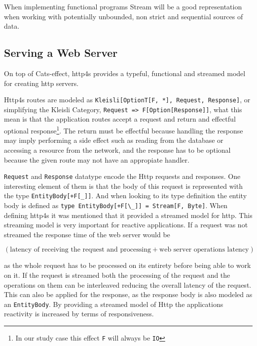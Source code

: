 \documentclass[../main.tex]{subfiles}
\begin{document}


When implementing functional programs Stream will be a good representation when working with
potentially unbounded, non strict and sequential sources of data.

\subsection{Serving a Web Server}
On top of Cats-effect, http4s provides a typeful, functional and streamed model
for creating http servers.

Http4s routes are modeled as \mbox{\texttt{Kleisli[OptionT[F,
*], Request, Response]}}, or simplifying the Kleisli Category, \mbox{\lstinline{Request => F[Option[Response]]}},
what this mean is that the application routes accept a request and return and
effectful optional response\footnote{In our study case this effect \texttt{F}
  will always be \texttt{IO}}. The return must be effectful because handling the
response may imply performing a side effect such as reading from the database or
accessing a resource from the network, and the response has to be optional
because the given route may not have an appropiate handler.

\texttt{Request} and \texttt{Response} datatype encode the Http requests and
responses. One interesting element of them is that the body of this request is
represented with the type \texttt{EntityBody[+F[\_]]}. And when looking to its
type definition the entity body is defined as
\lstinline{type EntityBody[+F[\_]] = Stream[F, Byte]}.
When defining http4s it was mentioned that it provided a streamed model for
http. This streaming model is very important for reactive applications. If a
request was not streamed the response time of the web
server would be

\begin{center}
$(\text{latency of receiving the request and processing} +
\text{web server operations latency})$
\end{center}

as the whole request has to be processed on its
entirety before being able to work on it. If the request is streamed both
the processing of the request and the operations on them can be interleaved
reducing the overall latency of the request. This can also be applied for the
response, as the response body is also modeled as an \texttt{EntityBody}. By
providing a streamed model of Http the applications reactivity is increased by
terms of responsiveness.
\end{document}
